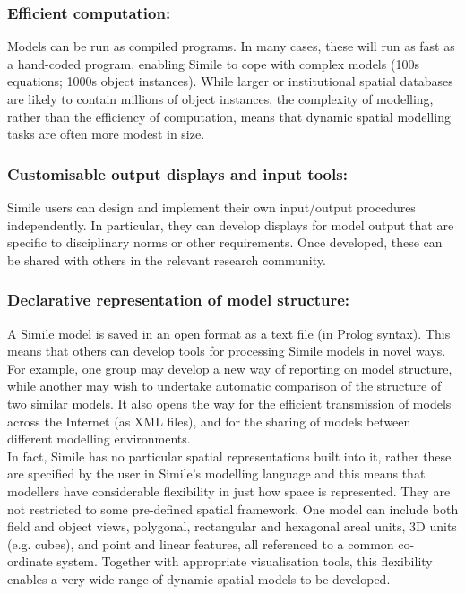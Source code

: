 	\subsubsection{Efficient computation:}
Models can be run as compiled programs. In many cases, these will run as fast as a hand-coded program, enabling Simile to cope with complex models (100s equations; 1000s object instances). While larger or institutional spatial databases are likely to contain millions of object instances, the complexity of modelling, rather than the efficiency of computation, means that dynamic spatial modelling tasks are often more modest in size.
	\subsubsection{Customisable output displays and input tools:}
Simile users can design and implement their own input/output procedures independently. In particular, they can develop displays for model output that are specific to disciplinary norms or other requirements. Once developed, these can be shared with others in the relevant research community.
	\subsubsection{Declarative representation of model structure:}
A Simile model is saved in an open format as a text file (in Prolog syntax). This means that others can develop tools for processing Simile models in novel ways. For example, one group may develop a new way of reporting on model structure, while another may wish to undertake automatic comparison of the structure of two similar models. It also opens the way for the efficient transmission of models across the Internet (as XML files), and for the sharing of models between different modelling environments.\\
	
In fact, Simile has no particular spatial representations built into it, rather these are specified by the user in Simile's modelling language and this means that modellers have considerable flexibility in just how space is represented. They are not restricted to some pre-defined spatial framework. One model can include both field and object views, polygonal, rectangular and hexagonal areal units, 3D units (e.g. cubes), and point and linear features, all referenced to a common co-ordinate system. Together with appropriate visualisation tools, this flexibility enables a very wide range of dynamic spatial models to be developed.\\
	
